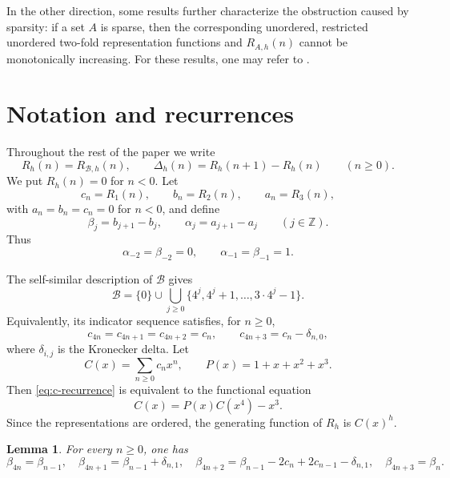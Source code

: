 \documentclass[10pt,a4paper]{amsart}
\newtheorem{lemma}[theorem]{Lemma}
\newcommand{\BaseB}{\mathcal B}
\begin{document}
In the other direction, some results further characterize the obstruction caused by sparsity: if a set $A$ is sparse, then the corresponding unordered, restricted unordered two-fold representation functions  and $R_{A,h}(n)$  cannot be monotonically increasing. For these results, one may refer to \cite{Balasubramanian,ESS4,ESS5,Kiss,KissSandorYang,Tang}.


\section{Notation and recurrences}

Throughout the rest of the paper we write
\[
R_h(n)=R_{\BaseB,h}(n),\qquad \Delta_h(n)=R_h(n+1)-R_h(n)\qquad (n\ge 0).
\]
We put $R_h(n)=0$ for $n<0$. Let
\[
c_n=R_1(n),\qquad b_n=R_2(n),\qquad a_n=R_3(n),
\]
with $a_n=b_n=c_n=0$ for $n<0$, and define
\[
\beta_j=b_{j+1}-b_j,\qquad \alpha_j=a_{j+1}-a_j\qquad(j\in\mathbb Z).
\]
Thus
\[
\alpha_{-2}=\beta_{-2}=0,\qquad \alpha_{-1}=\beta_{-1}=1.
\]

The self-similar description of $\BaseB$ gives
\[
\BaseB=\{0\}\cup \bigcup_{j\ge 0}\{4^j,4^j+1,\ldots,3\cdot 4^j-1\}.
\]
Equivalently, its indicator sequence satisfies, for $n\ge 0$,
\begin{equation}\label{eq:c-recurrence}
 c_{4n}=c_{4n+1}=c_{4n+2}=c_n,\qquad c_{4n+3}=c_n-\delta_{n,0},
\end{equation}
where $\delta_{i,j}$ is the Kronecker delta. Let
\[
C(x)=\sum_{n\ge 0}c_nx^n,\qquad P(x)=1+x+x^2+x^3.
\]
Then \eqref{eq:c-recurrence} is equivalent to the functional equation
\begin{equation}\label{eq:C}
C(x)=P(x)C(x^4)-x^3.
\end{equation}
Since the representations are ordered, the generating function of $R_h$ is $C(x)^h$.

\begin{lemma}\label{lem:beta-rec}
For every $n\ge 0$, one has
\[
\beta_{4n}=\beta_{n-1},\quad
\beta_{4n+1}=\beta_{n-1}+\delta_{n,1},\quad
\beta_{4n+2}=\beta_{n-1}-2c_n+2c_{n-1}-\delta_{n,1},\quad
\beta_{4n+3}=\beta_n.
\]
\end{lemma}
\end{document}
